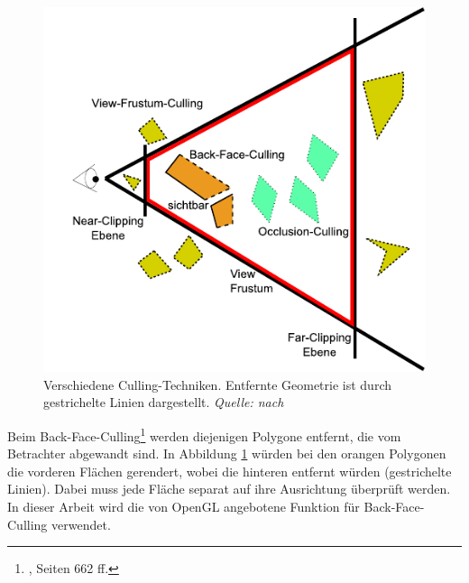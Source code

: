 \begin{figure}
  \centering
  \includegraphics[scale=0.8]{images/culling.pdf}
  \caption{Verschiedene Culling-Techniken. Entfernte Geometrie ist durch gestrichelte Linien dargestellt. \textit{Quelle: nach \cite{culling}} }
  \label{fig:basics:culling}
\end{figure}
Beim Back-Face-Culling\footnote{\cite{RTR3}, Seiten 662 ff.} werden diejenigen Polygone entfernt, die vom Betrachter abgewandt sind. In Abbildung \ref{fig:basics:culling} würden bei den orangen Polygonen die vorderen Flächen gerendert, wobei die hinteren entfernt würden (gestrichelte Linien). Dabei muss jede Fläche separat auf ihre Ausrichtung überprüft werden. In dieser Arbeit wird die von OpenGL angebotene Funktion für Back-Face-Culling verwendet.\\
